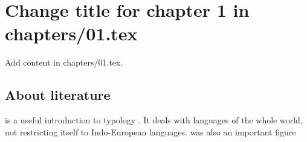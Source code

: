 \chapter{Change title for chapter 1 in chapters/01.tex}
Add content in chapters/01.tex.

\section{About literature}
\citet{Comrie1981} is a useful introduction to typology . %
It deals with languages of the whole world, not restricting itself to Indo-European languages. %
 was also an important figure %